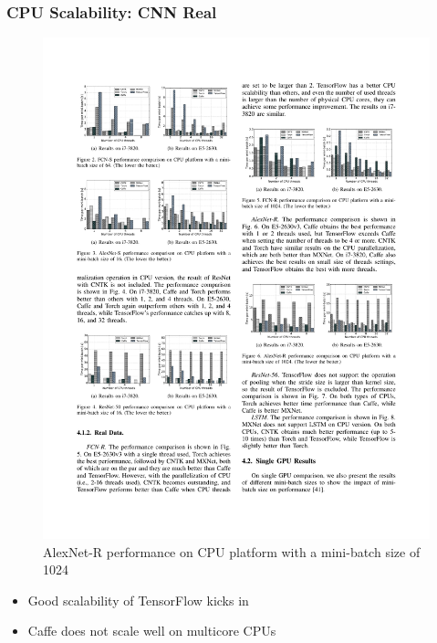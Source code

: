 
\begin{frame}
	\MyLogo
	\frametitle{CPU Scalability: CNN Real}  
	\begin{figure}[htbp] 
		\includegraphics[width=\linewidth]{figures/AlexNet-R1.pdf} 
		\caption{AlexNet-R performance on CPU platform with a mini-batch size of 1024}
	\end{figure}

\pause
	
\vskip -10pt
\begin{mdframed}[style=mystyle1]
\begin{itemize}
\item Good scalability of TensorFlow kicks in 
\item Caffe does not scale well on multicore CPUs
\end{itemize}
\end{mdframed}

\end{frame}

